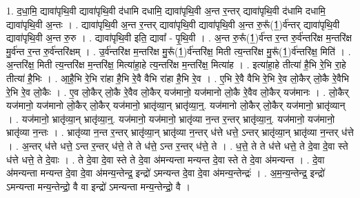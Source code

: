 \documentclass[17pt]{extarticle}
\begin{document}
1. द॒धा॒मि॒ द्यावा॑पृथि॒वी द्यावा॑पृथि॒वी द॑धामि दधामि॒ द्यावा॑पृथि॒वी अ॒न्त र॒न्तर् द्यावा॑पृथि॒वी द॑धामि दधामि॒ द्यावा॑पृथि॒वी अ॒न्तः । . द्यावा॑पृथि॒वी अ॒न्त र॒न्तर् द्यावा॑पृथि॒वी द्यावा॑पृथि॒वी अ॒न्त रु॒रू᳚(1॒)र्व॑न्तर् द्यावा॑पृथि॒वी द्यावा॑पृथि॒वी अ॒न्त रु॒रु । . द्यावा॑पृथि॒वी इति॒ द्यावा᳚ - पृ॒थि॒वी । . अ॒न्त रु॒रू᳚(1॒)र्व॑न्त र॒न्त रु॒र्व॑न्तरि॑क्ष म॒न्तरि॑क्ष मु॒र्व॑न्त र॒न्त रु॒र्व॑न्तरि॑क्षम् । . उ॒र्व॑न्तरि॑क्ष म॒न्तरि॑क्ष मु॒रू᳚(1॒)र्व॑न्तरि॑क्ष॒ मिती त्य॒न्तरि॑क्ष मु॒रू᳚(1॒)र्व॑न्तरि॑क्ष॒ मिति॑ । . अ॒न्तरि॑क्ष॒ मिती त्य॒न्तरि॑क्ष म॒न्तरि॑क्ष॒ मित्या॑हा॒हे त्य॒न्तरि॑क्ष म॒न्तरि॑क्ष॒ मित्या॑ह । . इत्या॑हा॒हे तीत्या॑ है॒भि रे॒भि रा॒हे तीत्या॑ है॒भिः । . आ॒है॒भि रे॒भि रा॑हा है॒भि रे॒वै वैभि रा॑हा है॒भि रे॒व । . ए॒भि रे॒वै वैभि रे॒भि रे॒व लो॒कैर् लो॒कै रे॒वैभि रे॒भि रे॒व लो॒कैः । . ए॒व लो॒कैर् लो॒कै रे॒वैव लो॒कैर् यज॑मानो॒ यज॑मानो लो॒कै रे॒वैव लो॒कैर् यज॑मानः । . लो॒कैर् यज॑मानो॒ यज॑मानो लो॒कैर् लो॒कैर् यज॑मानो॒ भ्रातृ॑व्या॒न् भ्रातृ॑व्या॒न्॒. यज॑मानो लो॒कैर् लो॒कैर् यज॑मानो॒ भ्रातृ॑व्यान् । . यज॑मानो॒ भ्रातृ॑व्या॒न् भ्रातृ॑व्या॒न्॒. यज॑मानो॒ यज॑मानो॒ भ्रातृ॑व्या न॒न्त र॒न्तर् भ्रातृ॑व्या॒न्॒. यज॑मानो॒ यज॑मानो॒ भ्रातृ॑व्या न॒न्तः । . भ्रातृ॑व्या न॒न्त र॒न्तर् भ्रातृ॑व्या॒न् भ्रातृ॑व्या न॒न्तर् ध॑त्ते धत्ते॒ ऽन्तर् भ्रातृ॑व्या॒न् भ्रातृ॑व्या न॒न्तर् ध॑त्ते । . अ॒न्तर् ध॑त्ते धत्ते॒ ऽन्त र॒न्तर् ध॑त्ते॒ ते ते ध॑त्ते॒ ऽन्त र॒न्तर् ध॑त्ते॒ ते । . ध॒त्ते॒ ते ते ध॑त्ते धत्ते॒ ते दे॒वा दे॒वा स्ते ध॑त्ते धत्ते॒ ते दे॒वाः । . ते दे॒वा दे॒वा स्ते ते दे॒वा अ॑मन्यन्ता मन्यन्त दे॒वा स्ते ते दे॒वा अ॑मन्यन्त । . दे॒वा अ॑मन्यन्ता मन्यन्त दे॒वा दे॒वा अ॑मन्य॒न्तेन्द्र॒ इन्द्रो॑ ऽमन्यन्त दे॒वा दे॒वा अ॑मन्य॒न्तेन्द्रः॑ । . अ॒म॒न्य॒न्तेन्द्र॒ इन्द्रो॑ ऽमन्यन्ता मन्य॒न्तेन्द्रो॒ वै वा इन्द्रो॑ ऽमन्यन्ता मन्य॒न्तेन्द्रो॒ वै । \newline
\end{document}

